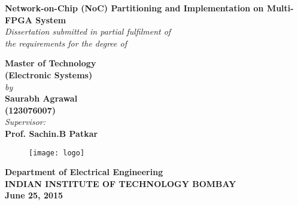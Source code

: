\thispagestyle{empty}
\begin{center}
\huge
\textbf{Network-on-Chip (NoC) Partitioning and Implementation on Multi-FPGA System}\\
\bigskip
\bigskip
\bigskip
\bigskip
\bigskip
\normalsize
\textit{Dissertation submitted in partial fulfilment of\\
the requirements for the degree of
 }\\
\vspace*{1cm}

\textbf{Master of Technology}\\
\textbf{(Electronic Systems)}\\
\vspace*{1cm}
\textit{by}\\
\vspace*{1cm}
\textbf{Saurabh Agrawal \\(123076007)}\\
\vspace*{1cm}
\textit{Supervisor:}\\
\textbf{Prof. Sachin.B Patkar }\\
\vspace*{1cm}
\begin{figure}[h!]
 \centering
 \texttt{[image: logo]}
\end{figure}
\bigskip
\bigskip
\large
\textbf{Department of Electrical Engineering}\\
\bigskip
\textbf{INDIAN INSTITUTE OF TECHNOLOGY BOMBAY}\\
\bigskip
\textbf{June 25, 2015}
\end{center}
